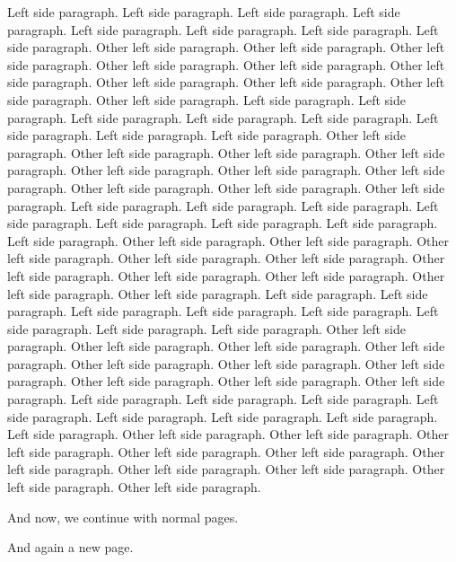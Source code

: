 \documentclass[a5paper,11pt]{article}
\begin{document}
\begin{pages}
\begin{Rightside}
            \pend            \pstart
                Left side paragraph. Left side paragraph. Left side paragraph. Left side paragraph. Left side paragraph. Left side paragraph. Left side paragraph. Left side paragraph.
            \pend
            \pstart
                Other left side paragraph.  Other left side paragraph.  Other left side paragraph.  Other left side paragraph.  Other left side paragraph.  Other left side paragraph.  Other left side paragraph.  Other left side paragraph.  Other left side paragraph.  Other left side paragraph.
            \pend            \pstart
                Left side paragraph. Left side paragraph. Left side paragraph. Left side paragraph. Left side paragraph. Left side paragraph. Left side paragraph. Left side paragraph.
            \pend
            \pstart
                Other left side paragraph.  Other left side paragraph.  Other left side paragraph.  Other left side paragraph.  Other left side paragraph.  Other left side paragraph.  Other left side paragraph.  Other left side paragraph.  Other left side paragraph.  Other left side paragraph.
            \pend            \pstart
                Left side paragraph. Left side paragraph. Left side paragraph. Left side paragraph. Left side paragraph. Left side paragraph. Left side paragraph. Left side paragraph.
            \pend
            \pstart
                Other left side paragraph.  Other left side paragraph.  Other left side paragraph.  Other left side paragraph.  Other left side paragraph.  Other left side paragraph.  Other left side paragraph.  Other left side paragraph.  Other left side paragraph.  Other left side paragraph.
            \pend            \pstart
                Left side paragraph. Left side paragraph. Left side paragraph. Left side paragraph. Left side paragraph. Left side paragraph. Left side paragraph. Left side paragraph.
            \pend
            \pstart
                Other left side paragraph.  Other left side paragraph.  Other left side paragraph.  Other left side paragraph.  Other left side paragraph.  Other left side paragraph.  Other left side paragraph.  Other left side paragraph.  Other left side paragraph.  Other left side paragraph.
            \pend            \pstart
                Left side paragraph. Left side paragraph. Left side paragraph. Left side paragraph. Left side paragraph. Left side paragraph. Left side paragraph. Left side paragraph.
            \pend
            \pstart
                \label{toto}Other left side paragraph.  Other left side paragraph.  Other left side paragraph.  Other left side paragraph.  Other left side paragraph.  Other left side paragraph.  Other left side paragraph.  Other left side paragraph.  Other left side paragraph.  Other left side paragraph.
            \pend
        \endnumbering
    \end{Rightside}

\end{pages}
\Pages

And now, we continue with normal pages.

\newpage

And again a new page.
\end{document}
